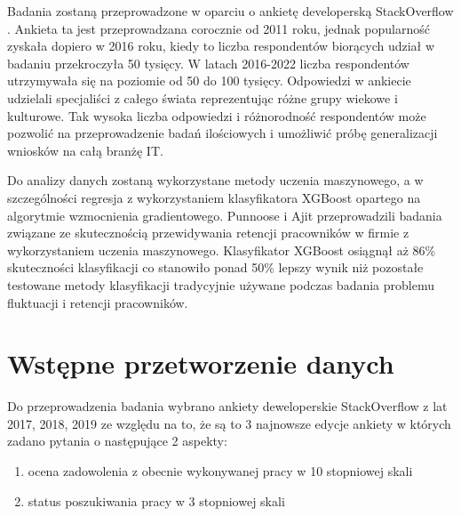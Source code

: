 Badania zostaną przeprowadzone w oparciu o ankietę developerską StackOverflow \cite{so-survey-info}.
Ankieta ta jest przeprowadzana corocznie od 2011 roku, jednak popularność zyskała dopiero w 2016 roku, kiedy to liczba respondentów biorących udział w badaniu przekroczyła 50 tysięcy.
W latach 2016-2022 liczba respondentów utrzymywała się na poziomie od 50 do 100 tysięcy.
Odpowiedzi w ankiecie udzielali specjaliści z całego świata reprezentując różne grupy wiekowe i kulturowe.
Tak wysoka liczba odpowiedzi i różnorodność respondentów może pozwolić na przeprowadzenie badań ilościowych i umożliwić próbę generalizacji wniosków na całą branżę IT.


Do analizy danych zostaną wykorzystane metody uczenia maszynowego, a w szczególności regresja z wykorzystaniem klasyfikatora XGBoost opartego na algorytmie wzmocnienia gradientowego.
Punnoose i Ajit \cite{punnoose-2016} przeprowadzili badania związane ze skutecznością przewidywania retencji pracowników w firmie z wykorzystaniem uczenia maszynowego.
Klasyfikator XGBoost osiągnął aż 86\% skuteczności klasyfikacji co stanowiło ponad 50\% lepszy wynik niż pozostałe testowane metody klasyfikacji tradycyjnie używane podczas badania problemu fluktuacji i retencji pracowników.

\section{Wstępne przetworzenie danych}\label{sec:analysis:preprocessing}
Do przeprowadzenia badania wybrano ankiety deweloperskie StackOverflow z lat 2017, 2018, 2019 ze względu na to, że są to 3 najnowsze edycje ankiety w których zadano pytania o następujące 2 aspekty:
\begin{enumerate}
    \item ocena zadowolenia z obecnie wykonywanej pracy w 10 stopniowej skali
    \item status poszukiwania pracy w 3 stopniowej skali
    \end{enumerate}

